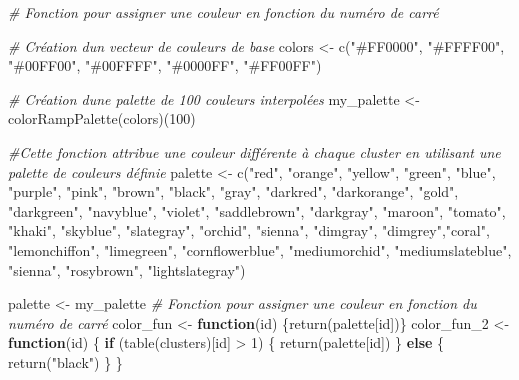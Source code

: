 \documentclass[
]{article}
\newenvironment{Shaded}{\begin{snugshade}}{\end{snugshade}}
\newcommand{\CommentTok}[1]{\textcolor[rgb]{0.56,0.35,0.01}{\textit{#1}}}
\newcommand{\ControlFlowTok}[1]{\textcolor[rgb]{0.13,0.29,0.53}{\textbf{#1}}}
\newcommand{\DecValTok}[1]{\textcolor[rgb]{0.00,0.00,0.81}{#1}}
\newcommand{\FunctionTok}[1]{\textcolor[rgb]{0.00,0.00,0.00}{#1}}
\newcommand{\NormalTok}[1]{#1}
\newcommand{\OtherTok}[1]{\textcolor[rgb]{0.56,0.35,0.01}{#1}}
\newcommand{\SpecialCharTok}[1]{\textcolor[rgb]{0.00,0.00,0.00}{#1}}
\newcommand{\StringTok}[1]{\textcolor[rgb]{0.31,0.60,0.02}{#1}}
\begin{document}
\begin{Shaded}
\begin{Highlighting}[]
\CommentTok{\# Fonction pour assigner une couleur en fonction du numéro de carré}

\CommentTok{\# Création d\textquotesingle{}un vecteur de couleurs de base}
\NormalTok{colors }\OtherTok{\textless{}{-}} \FunctionTok{c}\NormalTok{(}\StringTok{"\#FF0000"}\NormalTok{, }\StringTok{"\#FFFF00"}\NormalTok{, }\StringTok{"\#00FF00"}\NormalTok{, }\StringTok{"\#00FFFF"}\NormalTok{, }\StringTok{"\#0000FF"}\NormalTok{, }\StringTok{"\#FF00FF"}\NormalTok{)}

\CommentTok{\# Création d\textquotesingle{}une palette de 100 couleurs interpolées}
\NormalTok{my\_palette }\OtherTok{\textless{}{-}} \FunctionTok{colorRampPalette}\NormalTok{(colors)(}\DecValTok{100}\NormalTok{)}

\CommentTok{\#Cette fonction attribue une couleur différente à chaque cluster en utilisant une palette de couleurs définie}
\NormalTok{palette }\OtherTok{\textless{}{-}} \FunctionTok{c}\NormalTok{(}\StringTok{"red"}\NormalTok{, }\StringTok{"orange"}\NormalTok{, }\StringTok{"yellow"}\NormalTok{, }\StringTok{"green"}\NormalTok{, }\StringTok{"blue"}\NormalTok{, }\StringTok{"purple"}\NormalTok{, }\StringTok{"pink"}\NormalTok{, }\StringTok{"brown"}\NormalTok{, }\StringTok{"black"}\NormalTok{, }\StringTok{"gray"}\NormalTok{,}
               \StringTok{"darkred"}\NormalTok{, }\StringTok{"darkorange"}\NormalTok{, }\StringTok{"gold"}\NormalTok{, }\StringTok{"darkgreen"}\NormalTok{, }\StringTok{"navyblue"}\NormalTok{, }\StringTok{"violet"}\NormalTok{, }\StringTok{"saddlebrown"}\NormalTok{, }\StringTok{"darkgray"}\NormalTok{, }
               \StringTok{"maroon"}\NormalTok{, }\StringTok{"tomato"}\NormalTok{, }\StringTok{"khaki"}\NormalTok{, }\StringTok{"skyblue"}\NormalTok{, }\StringTok{"slategray"}\NormalTok{, }\StringTok{"orchid"}\NormalTok{, }\StringTok{"sienna"}\NormalTok{, }\StringTok{"dimgray"}\NormalTok{, }\StringTok{"dimgrey"}\NormalTok{,}\StringTok{"coral"}\NormalTok{, }\StringTok{"lemonchiffon"}\NormalTok{, }\StringTok{"limegreen"}\NormalTok{, }\StringTok{"cornflowerblue"}\NormalTok{, }\StringTok{"mediumorchid"}\NormalTok{, }\StringTok{"mediumslateblue"}\NormalTok{, }\StringTok{"sienna"}\NormalTok{, }\StringTok{"rosybrown"}\NormalTok{, }\StringTok{"lightslategray"}\NormalTok{)}
               
\NormalTok{palette }\OtherTok{\textless{}{-}}\NormalTok{ my\_palette}
\CommentTok{\# Fonction pour assigner une couleur en fonction du numéro de carré}
\NormalTok{color\_fun }\OtherTok{\textless{}{-}} \ControlFlowTok{function}\NormalTok{(id) \{}\FunctionTok{return}\NormalTok{(palette[id])\}}
\NormalTok{color\_fun\_2 }\OtherTok{\textless{}{-}} \ControlFlowTok{function}\NormalTok{(id) \{}
  \ControlFlowTok{if}\NormalTok{ (}\FunctionTok{table}\NormalTok{(clusters)[id] }\SpecialCharTok{\textgreater{}} \DecValTok{1}\NormalTok{) \{}
    \FunctionTok{return}\NormalTok{(palette[id])}
\NormalTok{  \} }\ControlFlowTok{else}\NormalTok{ \{}
    \FunctionTok{return}\NormalTok{(}\StringTok{"black"}\NormalTok{)}
\NormalTok{  \}}
\NormalTok{\}}


\end{Highlighting}
\end{Shaded}
\end{document}
